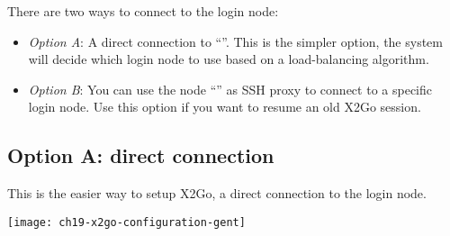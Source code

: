There are two ways to connect to the login node:
\begin{itemize}
\item \emph{Option A}: A direct connection to ``\strong{\emph{\loginnode}}''. This is the simpler option, the system will decide which
login node to use based on a load-balancing algorithm.
\item \emph{Option B}: You can use the node ``\strong{\emph{\loginnode}}'' as SSH proxy to connect to a specific login node. Use this option if you want to resume an old X2Go session.
\end{itemize}

\subsection{Option A: direct connection}
\label{subsec:sessions-x2go-optiona}
This is the easier way to setup X2Go, a direct connection to the login node.

\begin{center}
\texttt{[image: ch19-x2go-configuration-gent]}
\end{center}

